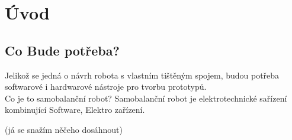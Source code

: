 \chapter*{Úvod}
{}

\section*{Co Bude potřeba?}%

Jelikož se jedná o návrh robota s vlastním tištěným spojem, budou potřeba softwarové i hardwarové nástroje pro tvorbu prototypů.\\

Co je to samobalanční robot?
Samobalanční robot je elektrotechnické sařízení kombinující Software, Elektro zařízení.




(já se snažím něčeho dosáhnout)
